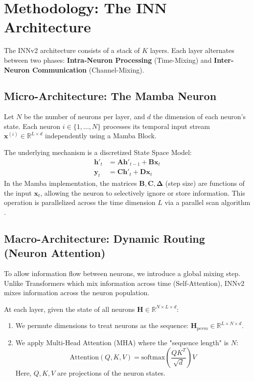 \documentclass[a4paper,11pt]{article}
\newcommand{\Real}{\mathbb{R}}
\newcommand{\bx}{\mathbf{x}}
\newcommand{\bh}{\mathbf{h}}
\newcommand{\bA}{\mathbf{A}}
\newcommand{\bB}{\mathbf{B}}
\newcommand{\bC}{\mathbf{C}}
\newcommand{\bD}{\mathbf{D}}
\newcommand{\softmax}{\text{softmax}}
\begin{document}
\section{Methodology: The INN Architecture}

The INNv2 architecture consists of a stack of $K$ layers. Each layer alternates between two phases: \textbf{Intra-Neuron Processing} (Time-Mixing) and \textbf{Inter-Neuron Communication} (Channel-Mixing).

\subsection{Micro-Architecture: The Mamba Neuron}
Let $N$ be the number of neurons per layer, and $d$ the dimension of each neuron's state.
Each neuron $i \in \{1, \dots, N\}$ processes its temporal input stream $\bx^{(i)} \in \Real^{L \times d}$ independently using a Mamba Block.

The underlying mechanism is a discretized State Space Model:
\begin{align}
    \bh'_t &= \bA \bh'_{t-1} + \bB \bx_t \\
    \mathbf{y}_t &= \bC \bh'_t + \bD \bx_t
\end{align}
In the Mamba implementation, the matrices $\bB, \bC, \mathbf{\Delta}$ (step size) are functions of the input $\bx_t$, allowing the neuron to selectively ignore or store information.
This operation is parallelized across the time dimension $L$ via a parallel scan algorithm \citep{gu2023mamba}.

\subsection{Macro-Architecture: Dynamic Routing (Neuron Attention)}
To allow information flow between neurons, we introduce a global mixing step. Unlike Transformers which mix information across time (Self-Attention), INNv2 mixes information across the neuron population.

At each layer, given the state of all neurons $\mathbf{H} \in \Real^{N \times L \times d}$:
\begin{enumerate}
    \item We permute dimensions to treat neurons as the sequence: $\mathbf{H}_{perm} \in \Real^{L \times N \times d}$.
    \item We apply Multi-Head Attention (MHA) where the "sequence length" is $N$:
    \begin{equation}
        \text{Attention}(Q, K, V) = \softmax\left(\frac{QK^T}{\sqrt{d}}\right)V
    \end{equation}
    Here, $Q, K, V$ are projections of the neuron states.
\end{enumerate}
\end{document}
